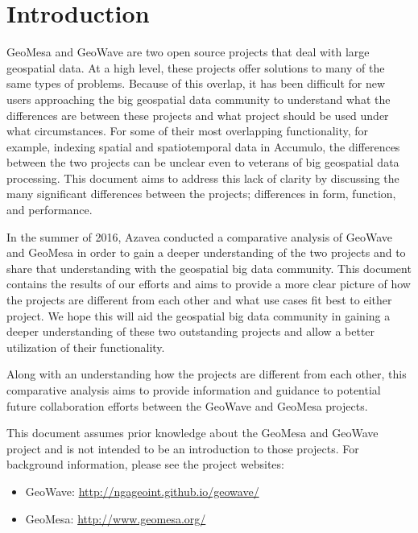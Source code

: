 \section{Introduction}
\label{sec:introduction}

GeoMesa and GeoWave are two open source projects that deal with large geospatial data.
At a high level, these projects offer solutions to many of the same types of problems.
Because of this overlap, it has been difficult for new users approaching the big geospatial data community to understand what the differences are between these projects and what project should be used under what circumstances.
For some of their most overlapping functionality, for example, indexing spatial and spatiotemporal data in Accumulo, the differences between the two projects can be unclear even to veterans of big geospatial data processing.
This document aims to address this lack of clarity by discussing the many significant differences between the projects;
differences in form, function, and performance.

In the summer of 2016, Azavea conducted a comparative analysis of GeoWave and GeoMesa in order to gain a deeper understanding of the two projects and to share that understanding with the geospatial big data community.
This document contains the results of our efforts and aims to provide a more clear picture of how the projects are different from each other and what use cases fit best to either project.
We hope this will aid the geospatial big data community in gaining a deeper understanding of these two outstanding projects and allow a better utilization of their functionality.

Along with an understanding how the projects are different from each other, this comparative analysis aims to provide information and guidance to potential future collaboration efforts between the GeoWave and GeoMesa projects.

This document assumes prior knowledge about the GeoMesa and GeoWave project and is not intended to be an introduction to those projects.
For background information, please see the project websites:


\begin{itemize}
\item  GeoWave: \url{http://ngageoint.github.io/geowave/}
\item  GeoMesa: \url{http://www.geomesa.org/}
\end{itemize}
